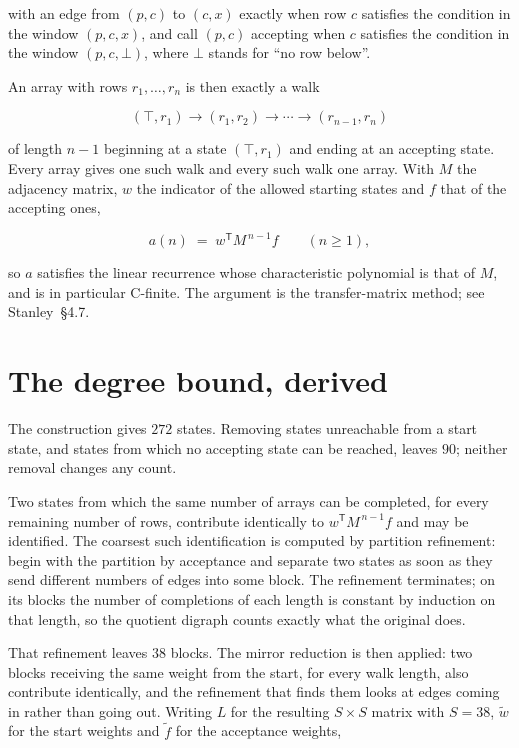 \documentclass[11pt]{article}
\theoremstyle{definition}
\begin{document}
with an edge from $(p,c)$ to $(c,x)$ exactly when row $c$ satisfies the condition in the window $(p,c,x)$, and call $(p,c)$ accepting when $c$ satisfies the condition in the window $(p,c,\bot)$, where $\bot$ stands for ``no row below''.

An array with rows $r_1,\dots,r_n$ is then exactly a walk

\[(\top,r_1) \to (r_1,r_2) \to \cdots \to (r_{n-1},r_n)\]

of length $n-1$ beginning at a state $(\top,r_1)$ and ending at an accepting state. Every array gives one such walk and every such walk one array. With $M$ the adjacency matrix, $w$ the indicator of the allowed starting states and $f$ that of the accepting ones,

\[a(n) \;=\; w^{\mathsf T} M^{\,n-1} f \qquad (n \ge 1),\]

so $a$ satisfies the linear recurrence whose characteristic polynomial is that of $M$, and is in particular C-finite. The argument is the transfer-matrix method; see Stanley~\S4.7.

\section{The degree bound, derived}

The construction gives $272$ states. Removing states unreachable from a start state, and states from which no accepting state can be reached, leaves $90$; neither removal changes any count.

Two states from which the same number of arrays can be completed, for every remaining number of rows, contribute identically to $w^{\mathsf T}M^{\,n-1}f$ and may be identified. The coarsest such identification is computed by partition refinement: begin with the partition by acceptance and separate two states as soon as they send different numbers of edges into some block. The refinement terminates; on its blocks the number of completions of each length is constant by induction on that length, so the quotient digraph counts exactly what the original does.

That refinement leaves $38$ blocks. The mirror reduction is then applied: two blocks receiving the same weight from the start, for every walk length, also contribute identically, and the refinement that finds them looks at edges coming in rather than going out. Writing $L$ for the resulting $S \times S$ matrix with $S = 38$, $\tilde w$ for the start weights and $\tilde f$ for the acceptance weights,
\end{document}

